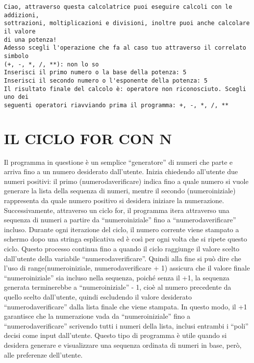 \documentclass[11pt]{article}
\begin{document}
    \begin{Verbatim}[commandchars=\\\{\}]
Ciao, attraverso questa calcolatrice puoi eseguire calcoli con le addizioni,
sottrazioni, moltiplicazioni e divisioni, inoltre puoi anche calcolare il valore
di una potenza!
Adesso scegli l'operazione che fa al caso tuo attraverso il correlato simbolo
(+, -, *, /, **): non lo so
Inserisci il primo numero o la base della potenza: 5
Inserisci il secondo numero o l'esponente della potenza: 5
Il risultato finale del calcolo è: operatore non riconosciuto. Scegli uno dei
seguenti operatori riavviando prima il programma: +, -, *, /, **
    \end{Verbatim}

    \section{IL CICLO FOR CON N}\label{il-ciclo-for-con-n}

    Il programma in questione è un semplice ``generatore'' di numeri che
parte e arriva fino a un numero desiderato dall'utente. Inizia chiedendo
all'utente due numeri positivi: il primo (numerodaverificare) indica
fino a quale numero si vuole generare la lista della sequenza di numeri,
mentre il secondo (numeroiniziale) rappresenta da quale numero positivo
si desidera iniziare la numerazione. Successivamente, attraverso un
ciclo for, il programma itera attraverso una sequenza di numeri a
partire da ``numeroiniziale'' fino a ``numerodaverificare'' incluso.
Durante ogni iterazione del ciclo, il numero corrente viene stampato a
schermo dopo una stringa esplicativa ed è così per ogni volta che si
ripete questo ciclo. Questo processo continua fino a quando il ciclo
raggiunge il valore scelto dall'utente della variabile
``numerodaverificare''. Quindi alla fine si può dire che l'uso di
range(numeroiniziale, numerodaverificare + 1) assicura che il valore
finale ``numeroiniziale'' sia incluso nella sequenza, poiché senza il
+1, la sequenza generata terminerebbe a ``numeroiniziale'' - 1, cioè al
numero precedente da quello scelto dall'utente, quindi escludendo il
valore desiderato ``numerodaverificare'' dalla lista finale che viene
stampata. In questo modo, il +1 garantisce che la numerazione vada da
``numeroiniziale'' fino a ``numerodaverificare'' scrivendo tutti i
numeri della lista, inclusi entrambi i ``poli'' decisi come input
dall'utente. Questo tipo di programma è utile quando si desidera
generare e visualizzare una sequenza ordinata di numeri in base, però,
alle preferenze dell'utente.
\end{document}
